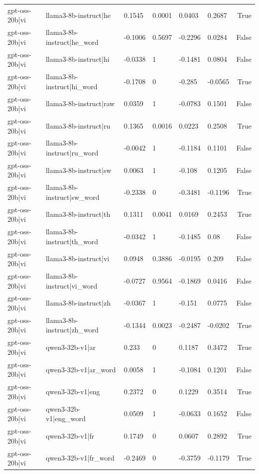 \begin{table}
\begin{tabular}{llllllr}
gpt-oss-20b|vi & llama3-8b-instruct|he & 0.1545 & 0.0001 & 0.0403 & 0.2687 & True \\
gpt-oss-20b|vi & llama3-8b-instruct|he_word & -0.1006 & 0.5697 & -0.2296 & 0.0284 & False \\
gpt-oss-20b|vi & llama3-8b-instruct|hi & -0.0338 & 1 & -0.1481 & 0.0804 & False \\
gpt-oss-20b|vi & llama3-8b-instruct|hi_word & -0.1708 & 0 & -0.285 & -0.0565 & True \\
gpt-oss-20b|vi & llama3-8b-instruct|raw & 0.0359 & 1 & -0.0783 & 0.1501 & False \\
gpt-oss-20b|vi & llama3-8b-instruct|ru & 0.1365 & 0.0016 & 0.0223 & 0.2508 & True \\
gpt-oss-20b|vi & llama3-8b-instruct|ru_word & -0.0042 & 1 & -0.1184 & 0.1101 & False \\
gpt-oss-20b|vi & llama3-8b-instruct|sw & 0.0063 & 1 & -0.108 & 0.1205 & False \\
gpt-oss-20b|vi & llama3-8b-instruct|sw_word & -0.2338 & 0 & -0.3481 & -0.1196 & True \\
gpt-oss-20b|vi & llama3-8b-instruct|th & 0.1311 & 0.0041 & 0.0169 & 0.2453 & True \\
gpt-oss-20b|vi & llama3-8b-instruct|th_word & -0.0342 & 1 & -0.1485 & 0.08 & False \\
gpt-oss-20b|vi & llama3-8b-instruct|vi & 0.0948 & 0.3886 & -0.0195 & 0.209 & False \\
gpt-oss-20b|vi & llama3-8b-instruct|vi_word & -0.0727 & 0.9564 & -0.1869 & 0.0416 & False \\
gpt-oss-20b|vi & llama3-8b-instruct|zh & -0.0367 & 1 & -0.151 & 0.0775 & False \\
gpt-oss-20b|vi & llama3-8b-instruct|zh_word & -0.1344 & 0.0023 & -0.2487 & -0.0202 & True \\
gpt-oss-20b|vi & qwen3-32b-v1|ar & 0.233 & 0 & 0.1187 & 0.3472 & True \\
gpt-oss-20b|vi & qwen3-32b-v1|ar_word & 0.0058 & 1 & -0.1084 & 0.1201 & False \\
gpt-oss-20b|vi & qwen3-32b-v1|eng & 0.2372 & 0 & 0.1229 & 0.3514 & True \\
gpt-oss-20b|vi & qwen3-32b-v1|eng_word & 0.0509 & 1 & -0.0633 & 0.1652 & False \\
gpt-oss-20b|vi & qwen3-32b-v1|fr & 0.1749 & 0 & 0.0607 & 0.2892 & True \\
gpt-oss-20b|vi & qwen3-32b-v1|fr_word & -0.2469 & 0 & -0.3759 & -0.1179 & True \\

\end{tabular}
\end{table}
